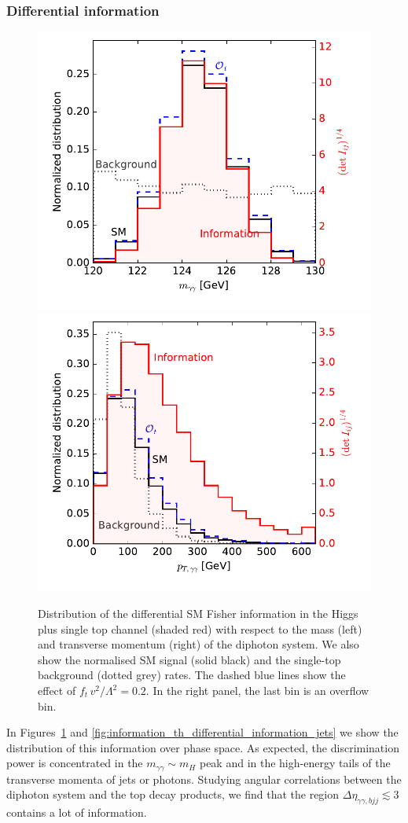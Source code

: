 \subsubsection{Differential information}

\begin{figure}
  \includegraphics[width=0.49 \textwidth,clip=true,trim=0.4cm 0.6cm 0.4cm 0.0cm]{fig/information/th_information_over_maa}%
  \includegraphics[width=0.49 \textwidth,clip=true,trim=0.4cm 0.6cm 0.4cm 0.0cm]{fig/information/th_information_over_ptaa}%
  \caption{Distribution of the differential SM Fisher information in
    the Higgs plus single top channel (shaded red) with respect to the
    mass (left) and transverse momentum (right) of the diphoton
    system. We also show the normalised SM signal (solid black) and
    the single-top background (dotted grey) rates. The dashed blue
    lines show the effect of
    $f_{t} \, v^2 / \Lambda^2 = 0.2$. In the right panel, the last bin
    is an overflow bin.}
  \label{fig:information_th_differential_information_photons}
\end{figure}

In Figures~\ref{fig:information_th_differential_information_photons}
and \ref{fig:information_th_differential_information_jets} we show the
distribution of this information over phase space. As expected, the
discrimination power is concentrated in the
$m_{\gamma \gamma} \sim m_H$ peak and in the high-energy tails of the
transverse momenta of jets or photons. Studying angular correlations
between the diphoton system and the top decay products, we find that the
region $\Delta \eta_{ \gamma \gamma, bjj} \lesssim 3$ contains a lot
of information.

